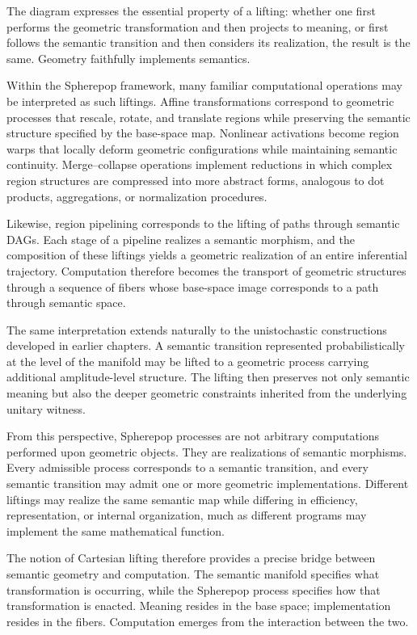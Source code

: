 \documentclass[12pt,letterpaper]{article}
\theoremstyle{remark}
\begin{document}
The diagram expresses the essential property of a lifting: whether one first performs the geometric transformation and then projects to meaning, or first follows the semantic transition and then considers its realization, the result is the same. Geometry faithfully implements semantics.

Within the Spherepop framework, many familiar computational operations may be interpreted as such liftings. Affine transformations correspond to geometric processes that rescale, rotate, and translate regions while preserving the semantic structure specified by the base-space map. Nonlinear activations become region warps that locally deform geometric configurations while maintaining semantic continuity. Merge--collapse operations implement reductions in which complex region structures are compressed into more abstract forms, analogous to dot products, aggregations, or normalization procedures.

Likewise, region pipelining corresponds to the lifting of paths through semantic DAGs. Each stage of a pipeline realizes a semantic morphism, and the composition of these liftings yields a geometric realization of an entire inferential trajectory. Computation therefore becomes the transport of geometric structures through a sequence of fibers whose base-space image corresponds to a path through semantic space.

The same interpretation extends naturally to the unistochastic constructions developed in earlier chapters. A semantic transition represented probabilistically at the level of the manifold may be lifted to a geometric process carrying additional amplitude-level structure. The lifting then preserves not only semantic meaning but also the deeper geometric constraints inherited from the underlying unitary witness.

From this perspective, Spherepop processes are not arbitrary computations performed upon geometric objects. They are realizations of semantic morphisms. Every admissible process corresponds to a semantic transition, and every semantic transition may admit one or more geometric implementations. Different liftings may realize the same semantic map while differing in efficiency, representation, or internal organization, much as different programs may implement the same mathematical function.

The notion of Cartesian lifting therefore provides a precise bridge between semantic geometry and computation. The semantic manifold specifies what transformation is occurring, while the Spherepop process specifies how that transformation is enacted. Meaning resides in the base space; implementation resides in the fibers. Computation emerges from the interaction between the two.
\end{document}
